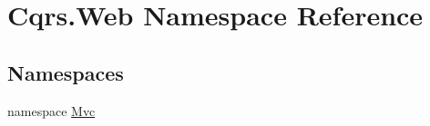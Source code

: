 \hypertarget{namespaceCqrs_1_1Web}{}\section{Cqrs.\+Web Namespace Reference}
\label{namespaceCqrs_1_1Web}
\subsection*{Namespaces}
\begin{DoxyCompactItemize}
\item 
namespace \hyperlink{namespaceCqrs_1_1Web_1_1Mvc}{Mvc}
\end{DoxyCompactItemize}
